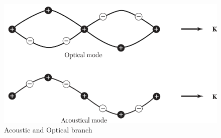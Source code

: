 \documentclass[%
 aip,
 amsmath,amssymb,
 reprint, floatfix%
]{revtex4-1}
\begin{document}
    \begin{figure}
        \centering
        \includegraphics[scale = 0.55]{Figures/optical_acoustic.png}
        \caption{Acoustic and Optical branch}
        \label{fig:modesbranch}
    \end{figure}
\end{document}
